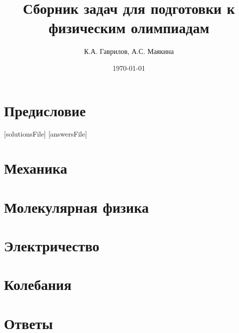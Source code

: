 \documentclass[a5paper, oneside]{book}
\title{Сборник задач для подготовки к физическим олимпиадам}
\author{К.А. Гаврилов, А.С. Маякина}
\date{\today}
\begin{document}
\maketitle
\tableofcontents
{}

\chapter*{Предисловие}


[solutionsFile]
[answersFile]

\chapter{Механика}









\chapter{Молекулярная физика}



\chapter{Электричество}






\chapter{Колебания}





\chapter*{Ответы}
\end{document}
